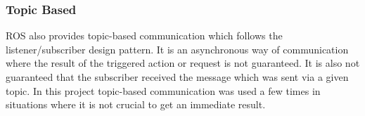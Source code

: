\documentclass[main.tex]{subfiles}
\begin{document}
			\subsubsection{Topic Based}
			
			ROS also provides topic-based communication which follows the listener/subscriber design pattern. It is an asynchronous way of communication where the result of the triggered action or request is not guaranteed. It is also not guaranteed that the subscriber received the message which was sent via a given topic. In this project topic-based communication was used a few times in situations where it is not crucial to get an immediate result.  
		 


	\endgroup
\end{document}
